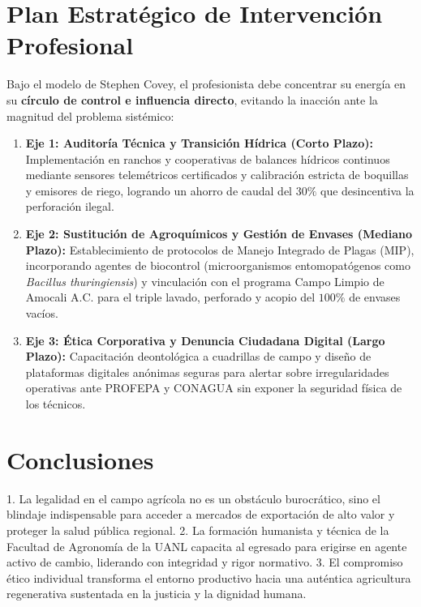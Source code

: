 \section{Plan Estratégico de Intervención Profesional}
Bajo el modelo de Stephen Covey, el profesionista debe concentrar su energía en su \textbf{círculo de control e influencia directo}, evitando la inacción ante la magnitud del problema sistémico:
\begin{enumerate}
    \item \textbf{Eje 1: Auditoría Técnica y Transición Hídrica (Corto Plazo):}
    Implementación en ranchos y cooperativas de balances hídricos continuos mediante sensores telemétricos certificados y calibración estricta de boquillas y emisores de riego, logrando un ahorro de caudal del $30\%$ que desincentiva la perforación ilegal.
    \item \textbf{Eje 2: Sustitución de Agroquímicos y Gestión de Envases (Mediano Plazo):}
    Establecimiento de protocolos de Manejo Integrado de Plagas (MIP), incorporando agentes de biocontrol (microorganismos entomopatógenos como \textit{Bacillus thuringiensis}) y vinculación con el programa Campo Limpio de Amocali A.C. para el triple lavado, perforado y acopio del $100\%$ de envases vacíos.
    \item \textbf{Eje 3: Ética Corporativa y Denuncia Ciudadana Digital (Largo Plazo):}
    Capacitación deontológica a cuadrillas de campo y diseño de plataformas digitales anónimas seguras para alertar sobre irregularidades operativas ante PROFEPA y CONAGUA sin exponer la seguridad física de los técnicos.
\end{enumerate}

\section{Conclusiones}
1. La legalidad en el campo agrícola no es un obstáculo burocrático, sino el blindaje indispensable para acceder a mercados de exportación de alto valor y proteger la salud pública regional.
2. La formación humanista y técnica de la Facultad de Agronomía de la UANL capacita al egresado para erigirse en agente activo de cambio, liderando con integridad y rigor normativo.
3. El compromiso ético individual transforma el entorno productivo hacia una auténtica agricultura regenerativa sustentada en la justicia y la dignidad humana.

